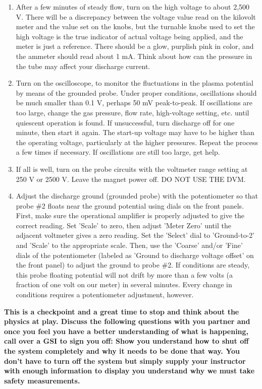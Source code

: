 \documentclass{../lab}
\begin{document}
\begin{enumerate}
    \item After a few minutes of steady flow, turn on the high voltage to about 2,500 V. There will be a discrepancy between the voltage value read on the kilovolt meter and the value set on the knobs, but the turnable knobs used to set the high voltage is the true indicator of actual voltage being applied, and the meter is just a reference. There should be a glow, purplish pink in color, and the ammeter should read about 1 mA. Think about how can the pressure in the tube may affect your discharge current.

    \item Turn on the oscilloscope, to monitor the fluctuations in the plasma potential by means of the grounded probe. Under proper conditions, oscillations should be much smaller than 0.1 V, perhaps 50 mV peak-to-peak. If oscillations are too large, change the gas pressure, flow rate, high-voltage setting, etc. until quiescent operation is found. If unsuccessful, turn discharge off for one minute, then start it again. The start-up voltage may have to be higher than the operating voltage, particularly at the higher pressures. Repeat the process a few times if necessary. If oscillations are still too large, get help.

    \item If all is well, turn on the probe circuits with the voltmeter range setting at 250 V or 2500 V. Leave the magnet power off. DO NOT USE THE DVM.

    \item Adjust the discharge ground (grounded probe) with the potentiometer so that probe \#2 floats near the ground potential using dials on the front panels. First, make sure the operational amplifier is properly adjusted to give the correct reading. Set 'Scale' to zero, then adjust 'Meter Zero' until the adjacent voltmeter gives a zero reading. Set the 'Select' dial to 'Ground-to-2' and 'Scale' to the appropriate scale. Then, use the 'Coarse' and/or 'Fine' dials of the potentiometer (labeled as 'Ground to discharge voltage offset' on the front panel) to adjust the ground to probe \#2. If conditions are steady, this probe floating potential will not drift by more than a few volts (a fraction of one volt on our meter) in several minutes. Every change in conditions requires a potentiometer adjustment, however.

\end{enumerate}

\textbf{This is a checkpoint and a great time to stop and think about the physics at play. Discuss the following questions with you partner and once you feel you have a better understanding of what is happening, call over a GSI to sign you off:
Show you understand how to shut off the system completely and why it needs to be done that way. You don't have to turn off the system but simply supply your instructor with enough information to display you understand why we must take safety measurements.}
\end{document}
